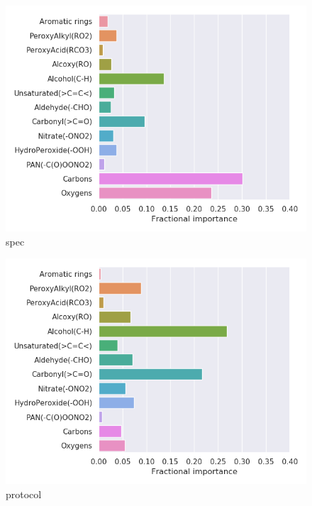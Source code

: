 \begin{subfigure}[b]{0.4\textwidth}
    \centering
    \includegraphics[width=\textwidth]{outputs/t-SNE/spec/legend.png}
    \caption{spec}
    \label{fig:legend_t-SNE_spec}
\end{subfigure}
\begin{subfigure}[b]{0.4\textwidth}
    \centering
    \includegraphics[width=\textwidth]{outputs/t-SNE/protocol/legend.png}
    \caption{protocol}
    \label{fig:legend_t-SNE_protocol}
\end{subfigure}
